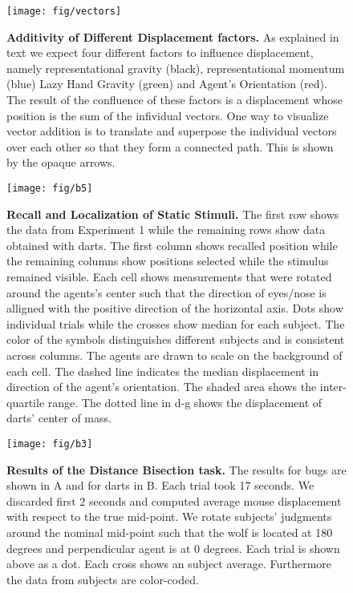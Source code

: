 \documentclass[10pt]{article}
\begin{document}
\begin{figure}[!ht]
\begin{center}
\texttt{[image: fig/vectors]}
\end{center}
\caption{
{\bf Additivity of Different Displacement factors.}
As explained in text we expect four different factors to influence displacement, namely representational gravity (black), representational momentum (blue) Lazy Hand Gravity (green) and Agent's Orientation (red). The result of the confluence of these factors is a displacement whose position is the sum of the infividual vectors. One way to visualize vector addition is to translate and superpose the individual vectors over each other so that they form a connected path. This is shown by the opaque arrows.  
}\label{fig:vectors}
\end{figure}

\begin{figure}[!ht]
\begin{center}
\texttt{[image: fig/b5]}
\end{center}
\caption{
{\bf Recall and Localization of Static Stimuli.}
The first row shows the data from Experiment 1 while the remaining rows show data obtained with darts. 
The first column shows recalled position while the remaining columns show positions selected while the stimulus remained visible.
Each cell shows measurements that were rotated around the agents's center such that the direction of eyes/nose is alligned with the positive direction of the horizontal axis.  
Dots show individual trials while the crosses show median for each subject.  
The color of the symbols distinguishes different subjects and is consistent across columns.
The agents are drawn to scale on the background of each cell.  
The dashed line indicates the median displacement in direction of the agent's orientation. 
The shaded area shows the inter-quartile range. 
The dotted line in d-g shows the displacement of darts' center of mass.
}
\label{fig:b5}
\end{figure}

\begin{figure}[!ht]
\begin{center}
\texttt{[image: fig/b3]}
\end{center}
\caption{
{\bf Results of the Distance Bisection task.}
The results for bugs are shown in A and for darts in B.
Each trial took 17 seconds. We discarded first 2 seconds and computed average mouse displacement with respect to the true mid-point. We 
rotate subjects' judgments around the nominal mid-point such that the wolf is located at 180 degrees and perpendicular agent is at 0 degrees. Each trial is shown above as a dot. Each cross shows an subject average. Furthermore the data from subjects are color-coded.
}
\label{fig:b3}
\end{figure}
\end{document}
